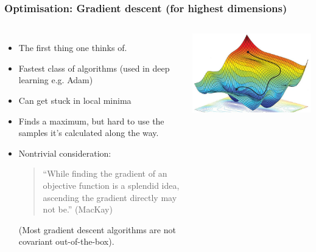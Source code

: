 \documentclass[aspectratio=169]{beamer}
\begin{document}
\begin{frame}
    \frametitle{Optimisation: Gradient descent (for highest dimensions)}
    \begin{columns}
        \begin{itemize}
            \item The first thing one thinks of.
            \item Fastest class of algorithms (used in deep learning e.g. Adam)
            \item Can get stuck in local minima
            \item Finds a maximum, but hard to use the samples it's calculated along the way.
            \item Nontrivial consideration:
                \begin{quote}
                    ``While finding the gradient of an objective function is a splendid
                    idea, ascending the gradient directly may not be.'' (MacKay)
                \end{quote}
                (Most gradient descent algorithms are not covariant out-of-the-box).
        \end{itemize}
        
        \includegraphics[width=\textwidth]{figures/gradient_descent}
    \end{columns}
\end{frame}
\end{document}
